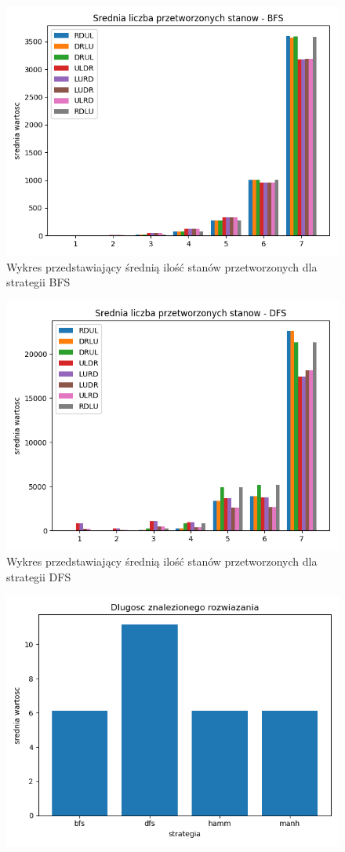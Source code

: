 \documentclass{classrep}
\begin{document}
{\begin{figure}
\includegraphics [scale=0.5]{przetworzone_BFS}
\caption{Wykres przedstawiający średnią ilość stanów przetworzonych dla strategii BFS}
\end{figure}
\begin{figure}
\centering
\includegraphics [scale=0.5]{przetworzone_DFS}
\caption{Wykres przedstawiający średnią ilość stanów przetworzonych dla strategii DFS}
\end{figure}
\begin{figure}
\centering
\includegraphics [scale=0.5]{dlugosc}

\end{figure}}
\end{document}
